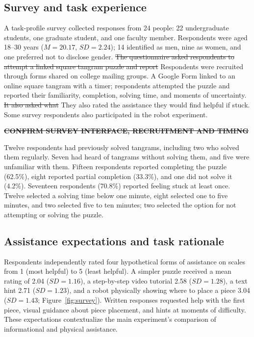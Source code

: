 \documentclass[sigconf,anonymous,balance=false]{aamas} %
\DeclareRobustCommand{\DIFadd}[1]{{\color{reviewadd}#1}} %
\DeclareRobustCommand{\DIFdel}[1]{{\color{reviewdel}\sout{#1}}} %
\providecommand{\DIFaddbegin}{} %
\providecommand{\DIFaddend}{} %
\providecommand{\DIFdelbegin}{} %
\providecommand{\DIFdelend}{} %
\providecommand{\DIFscaledelfig}{0.5}
\newlength{\DIFdelgraphicswidth} %
\newlength{\DIFdelgraphicsheight} %
\providecommand{\DIFaddincludegraphics}[2][]{{\color{blue}\fbox{\DIFOincludegraphics[#1]{#2}}}} %
\providecommand{\DIFdelincludegraphics}[2][]{%
\sbox{\DIFdelgraphicsbox}{\DIFOincludegraphics[#1]{#2}}%
\settoboxwidth{\DIFdelgraphicswidth}{\DIFdelgraphicsbox} %
\settoboxtotalheight{\DIFdelgraphicsheight}{\DIFdelgraphicsbox} %
\scalebox{\DIFscaledelfig}{%
\parbox[b]{\DIFdelgraphicswidth}{\usebox{\DIFdelgraphicsbox}\\[-\baselineskip] \rule{\DIFdelgraphicswidth}{0em}}\llap{\resizebox{\DIFdelgraphicswidth}{\DIFdelgraphicsheight}{%
\setlength{\unitlength}{\DIFdelgraphicswidth}%
\begin{picture}(1,1)%
\thicklines\linethickness{2pt} %
{\color[rgb]{1,0,0}\put(0,0){\framebox(1,1){}}}%
{\color[rgb]{1,0,0}\put(0,0){\line( 1,1){1}}}%
{\color[rgb]{1,0,0}\put(0,1){\line(1,-1){1}}}%
\end{picture}%
}\hspace*{3pt}}} %
} %
\DeclareRobustCommand{\DIFaddbegin}{\DIFOaddbegin \let\includegraphics\DIFaddincludegraphics} %
\DeclareRobustCommand{\DIFaddend}{\DIFOaddend \let\includegraphics\DIFOincludegraphics} %
\DeclareRobustCommand{\DIFdelbegin}{\DIFOdelbegin \let\includegraphics\DIFdelincludegraphics} %
\DeclareRobustCommand{\DIFdelend}{\DIFOaddend \let\includegraphics\DIFOincludegraphics} %
\begin{document}
\subsection{Survey and task experience}

A task-profile survey collected responses from 24 people: 22 undergraduate students, one graduate student, and one faculty member. Respondents were aged 18--30 years ($M=20.17$, $SD=2.24$); 14 identified as men, nine as women, and one preferred not to disclose gender. \DIFdelbegin \DIFdel{The questionnaire asked respondents to attempt a linked square tangram puzzle and report }\DIFdelend \DIFaddbegin \DIFadd{Respondents were recruited through forms shared on college mailing groups. A Google Form linked to an online square tangram with a timer; respondents attempted the puzzle and reported }\DIFaddend their familiarity, completion, solving time, and moments of uncertainty. \DIFdelbegin \DIFdel{It also asked what }\DIFdelend \DIFaddbegin \DIFadd{They also rated the }\DIFaddend assistance they would find helpful if stuck. \DIFaddbegin \DIFadd{Some survey respondents also participated in the robot experiment.
}\DIFaddend 

\DIFdelbegin \textbf{\DIFdel{CONFIRM SURVEY INTERFACE, RECRUITMENT AND TIMING}}%

\DIFdelend Twelve respondents had previously solved tangrams, including two who solved them regularly. Seven had heard of tangrams without solving them, and five were unfamiliar with them. Fifteen respondents reported completing the puzzle (62.5\%), eight reported partial completion (33.3\%), and one did not solve it (4.2\%). Seventeen respondents (70.8\%) reported feeling stuck at least once. Twelve selected a solving time below one minute, eight selected one to five minutes, and two selected five to ten minutes; two selected the option for not attempting or solving the puzzle.

\subsection{Assistance expectations and task rationale}

Respondents independently rated four hypothetical forms of assistance on scales from 1 (most helpful) to 5 (least helpful). A simpler puzzle received a mean rating of 2.04 ($SD=1.16$), a step-by-step video tutorial 2.58 ($SD=1.28$), a text hint 2.71 ($SD=1.23$), and a robot physically showing where to place a piece 3.04 ($SD=1.43$; Figure~\ref{fig:survey}). Written responses requested help with the first piece, visual guidance about piece placement, and hints at moments of difficulty. These expectations contextualize the main experiment's comparison of informational and physical assistance.
\end{document}
